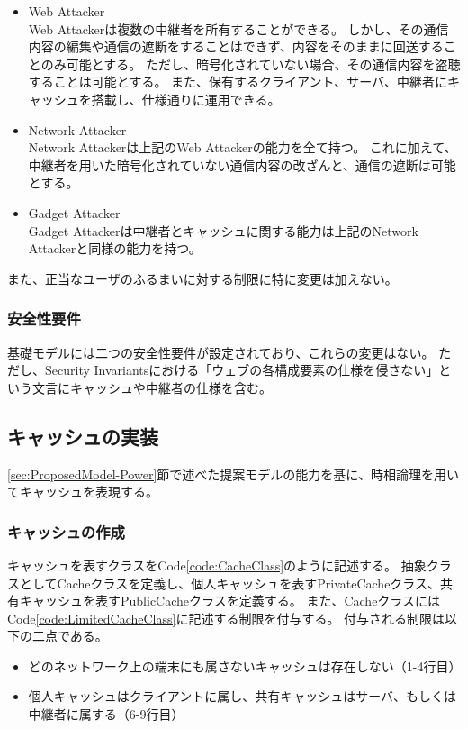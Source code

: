 \documentclass[journal]{IEEEtran}
\begin{document}
\begin{itemize}
\item Web Attacker\\
Web Attackerは複数の中継者を所有することができる。
しかし、その通信内容の編集や通信の遮断をすることはできず、内容をそのままに回送することのみ可能とする。
ただし、暗号化されていない場合、その通信内容を盗聴することは可能とする。
また、保有するクライアント、サーバ、中継者にキャッシュを搭載し、仕様通りに運用できる。
\item Network Attacker\\
Network Attackerは上記のWeb Attackerの能力を全て持つ。
これに加えて、中継者を用いた暗号化されていない通信内容の改ざんと、通信の遮断は可能とする。
\item Gadget Attacker\\
Gadget Attackerは中継者とキャッシュに関する能力は上記のNetwork Attackerと同様の能力を持つ。
\end{itemize}

また、正当なユーザのふるまいに対する制限に特に変更は加えない。

\subsubsection{安全性要件}
基礎モデルには二つの安全性要件が設定されており、これらの変更はない。
ただし、Security Invariantsにおける「ウェブの各構成要素の仕様を侵さない」という文言にキャッシュや中継者の仕様を含む。

\subsection{キャッシュの実装}
\ref{sec:ProposedModel-Power}節で述べた提案モデルの能力を基に、時相論理を用いてキャッシュを表現する。

\subsubsection{キャッシュの作成}
キャッシュを表すクラスをCode\ref{code:CacheClass}のように記述する。
抽象クラスとしてCacheクラスを定義し、個人キャッシュを表すPrivateCacheクラス、共有キャッシュを表すPublicCacheクラスを定義する。
また、CacheクラスにはCode\ref{code:LimitedCacheClass}に記述する制限を付与する。
付与される制限は以下の二点である。
\begin{itemize}
\item どのネットワーク上の端末にも属さないキャッシュは存在しない（1-4行目）
\item 個人キャッシュはクライアントに属し、共有キャッシュはサーバ、もしくは中継者に属する（6-9行目）
\end{itemize}
\end{document}
